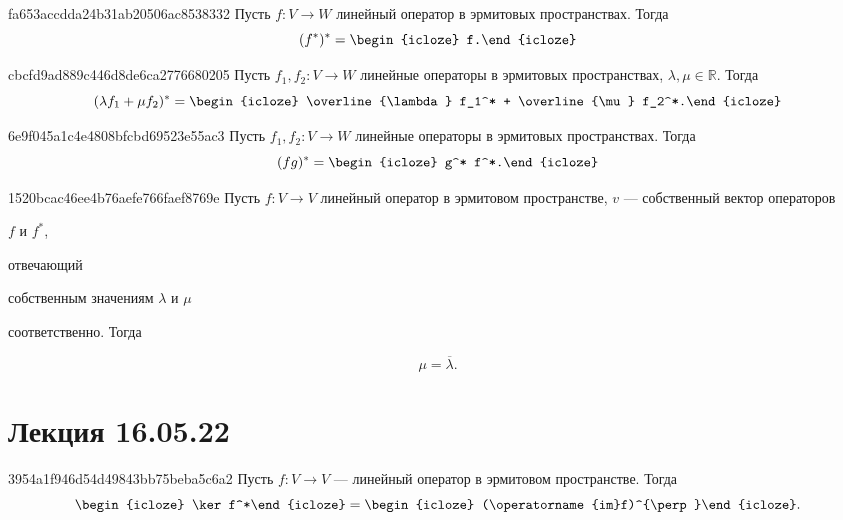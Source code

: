 \begin{note}{fa653accdda24b31ab20506ac8538332}
    Пусть \({ f: V \to W }\) линейный оператор в эрмитовых пространствах.
    Тогда
    \[
        (f^*)^* = \begin{icloze}{1}f.\end{icloze}
    \]
\end{note}

\begin{note}{cbcfd9ad889c446d8de6ca2776680205}
    Пусть \({ f_1, f_2 : V \to W }\) линейные операторы в эрмитовых пространствах,\: \({ \lambda, \mu  \in \mathbb R }\).
    Тогда
    \[
        (\lambda f_1 + \mu f_2)^* = \begin{icloze}{1}\overline{\lambda} f_1^* + \overline{\mu} f_2^*.\end{icloze}
    \]
\end{note}

\begin{note}{6e9f045a1c4e4808bfcbd69523e55ac3}
    Пусть \({ f_1, f_2 : V \to W }\) линейные операторы в эрмитовых пространствах.
    Тогда
    \[
        (fg)^* = \begin{icloze}{1}g^* f^*.\end{icloze}
    \]
\end{note}

\begin{note}{1520bcac46ee4b76aefe766faef8769e}
    Пусть \({ f : V \to V }\) линейный оператор в эрмитовом пространстве, \({ v }\) --- собственный вектор операторов \begin{icloze}{2}\({ f }\) и \({ f^* }\),\end{icloze} отвечающий \begin{icloze}{3}собственным значениям \({ \lambda }\) и \({ \mu }\)\end{icloze} соответственно.
    Тогда
    \begin{icloze}{1}
        \[
            \mu = \overline{\lambda}.
        \]
    \end{icloze}
\end{note}

\section{Лекция 16.05.22}
\begin{note}{3954a1f946d54d49843bb75beba5c6a2}
    Пусть \({ f : V \to V }\) --- линейный оператор в эрмитовом пространстве.
    Тогда
    \[
        \begin{icloze}{2}\ker f^*\end{icloze} = \begin{icloze}{1}(\operatorname{im}f)^{\perp}\end{icloze}.
    \]
\end{note}

